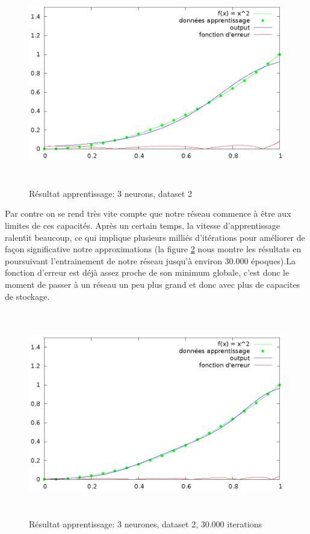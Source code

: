 \documentclass[twoside,openright,a4paper,11pt,french]{article}
\begin{document}
\begin{figure}[ht]
\centering
\includegraphics[width=12cm,height=9cm]{./pics/chartsqtest2.eps}
\caption{Résultat apprentissage: 3 neurons, dataset 2}
\label{fig:chartsqtest2}
\end{figure}

Par contre on se rend très vite compte que notre réseau commence à être aux limites
de ces capacités.
Après un certain temps, la vitesse d'apprentissage ralentit beaucoup, 
ce qui implique plusieurs milliés d'itérations pour améliorer de façon 
significative notre approximations (la figure \ref{fig:chartsqtest3} nous
montre les résultats en poursuivant l'entrainement de notre réseau jusqu'à
environ 30.000 époques).La fonction d'erreur est déjà assez proche de son minimum 
globale, c'est donc le moment de passer à un réseau un peu plus grand
et donc avec plus de capacites de stockage.


\begin{figure}[ht]
\centering
\includegraphics[width=12cm,height=9cm]{./pics/chartsqtest3.eps}
\caption{Résultat apprentissage: 3 neurones, dataset 2, 30.000 iterations}
\label{fig:chartsqtest3}
\end{figure}
\end{document}
